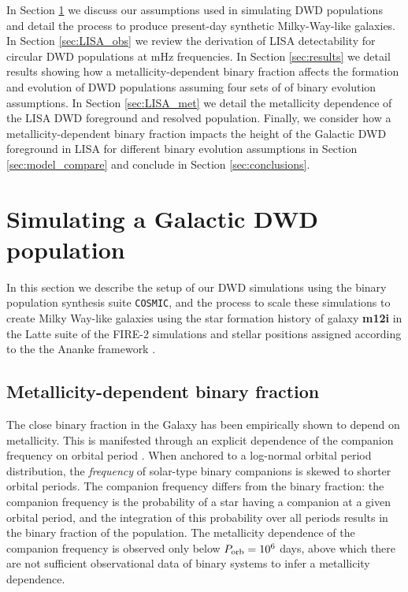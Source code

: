 \documentclass[twocolumn, linenumbers]{aastex631}
\newcommand{\cosmic}{\texttt{COSMIC}}
\begin{document}
In Section \ref{sec:simulations} we discuss our assumptions used in simulating DWD populations and detail the process to produce present-day synthetic Milky-Way-like galaxies. In Section \ref{sec:LISA_obs} we review the derivation of LISA detectability for circular DWD populations at mHz frequencies. In Section \ref{sec:results} we detail results showing how a metallicity-dependent binary fraction affects the formation and evolution of DWD populations assuming four sets of of binary evolution assumptions. In Section \ref{sec:LISA_met} we detail the metallicity dependence of the LISA DWD foreground and resolved population. Finally, we consider how a metallicity-dependent binary fraction impacts the height of the Galactic DWD foreground in LISA for different binary evolution assumptions in Section \ref{sec:model_compare} and conclude in Section \ref{sec:conclusions}.  

\section{Simulating a Galactic DWD population}\label{sec:simulations}
In this section we describe the setup of our DWD simulations using the binary population synthesis suite \cosmic, and the process to scale these simulations to create Milky Way-like galaxies using the star formation history of galaxy \textbf{m12i} in the Latte suite of the FIRE-2 simulations \citep{Wetzel2016, Hopkins2018} and stellar positions assigned according to the the Ananke framework \citep{Sanderson2020}. 

\subsection{Metallicity-dependent binary fraction}\label{subsec:metbinfrac}
The close binary fraction in the Galaxy has been empirically shown to depend on metallicity. This is manifested through an explicit dependence of the companion frequency on orbital period \citep{Moe2021}. When anchored to a log-normal orbital period distribution, the \emph{frequency} of solar-type binary companions is skewed to shorter orbital periods. The companion frequency differs from the binary fraction: the companion frequency is the probability of a star having a companion at a given orbital period, and the integration of this probability over all periods results in the binary fraction of the population. The metallicity dependence of the companion frequency is observed only below $P_{\rm{orb}}=10^6$ days, above which there are not sufficient observational data of binary systems to infer a metallicity dependence.
\end{document}
